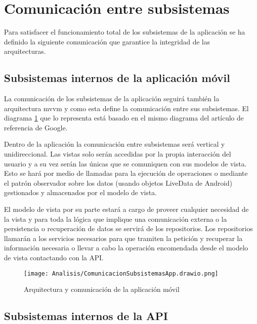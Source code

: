 \section{Comunicación entre subsistemas}

Para satisfacer el funcionamiento total de los subsistemas de la aplicación se ha definido la siguiente comunicación que garantice la integridad de las arquitecturas.

\subsection{Subsistemas internos de la aplicación móvil}

La comunicación de los subsistemas de la aplicación seguirá también la arquitectura \acrshort{mvvm} y como esta define la comunicación entre sus subsistemas. El diagrama \ref{fig:sub-app} que lo representa está basado en el mismo diagrama del artículo de referencia de Google\cite{mvvm2021}.

Dentro de la aplicación la comunicación entre subsistemas será vertical y unidireccional. Las vistas solo serán accedidas por la propia interacción del usuario y a su vez serán las únicas que se comuniquen con sus modelos de vista. Esto se hará por medio de llamadas para la ejecución de operaciones o mediante el patrón observador sobre los datos (usando objetos LiveData\cite{liveData2021} de Android) gestionados y almacenados por el modelo de vista.

El modelo de vista por su parte estará a cargo de proveer cualquier necesidad de la vista y para toda la lógica que implique una comunicación externa o la persistencia o recuperación de datos se servirá de los repositorios. Los repositorios llamarán a los servicios necesarios para que tramiten la petición y recuperar la información necesaria o llevar a cabo la operación encomendada desde el modelo de vista contactando con la API.

\begin{figure}[H]
    \centering
    \texttt{[image: Analisis/ComunicacionSubsistemasApp.drawio.png]}
    \caption{Arquitectura y comunicación de la aplicación móvil}
    \label{fig:sub-app}
\end{figure}

\subsection{Subsistemas internos de la API}

